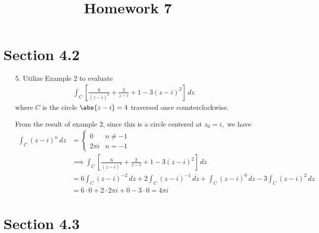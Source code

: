 \documentclass{article}
\begin{document}
\title{Homework 7}
\maketitle
\thispagestyle{fancy}

\section*{Section 4.2}

\begin{itemize}
	\item[5.] Utilize Example 2 to evaluate
		\begin{align*}
			\int_{C} \left[ \frac{6}{(z-i)^2} + \frac{2}{z-i} + 1 - 3(z-i)^2 \right]\, dz
		\end{align*}
		where $C$ is the circle $\abs{z-i}=4$ traversed once counterclockwise.
		\begin{soln}
			From the result of example 2, since this is a circle centered at $z_0=i,$ we have
			\begin{align*}
				\int_C (z-i)^n\, dz &= \begin{cases}
					0 & n \neq -1 \\
					2\pi i & n = -1
				\end{cases} \\
				&\implies \int_C \left[ \frac{6}{(z-i)^2} + \frac{2}{z-i} + 1 - 3\left( z-i \right)^2 \right]\, dz \\
				&= 6\int_C (z-i)^{-2}\, dz + 2\int_C (z-i)^{-1}\, dz + \int_C (z-i)^0\, dz - 3\int_C (z-i)^2\, dz \\
				&= 6\cdot 0 + 2\cdot 2\pi i + 0 - 3\cdot 0 = 4\pi i
			\end{align*}
		\end{soln}
		
\end{itemize}

\section*{Section 4.3}
\end{document}
